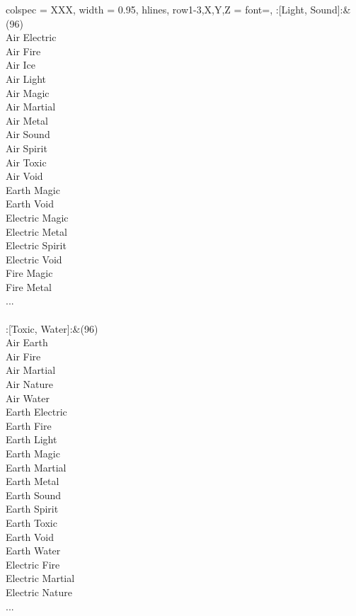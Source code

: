 \begin{longtblr}[
	caption = {2v2 Attacking Effective},
	label = {2v2-Attacking-Effective},
]{
	colspec = {XXX}, width = 0.95\linewidth,
	hlines,
	row{1-3,X,Y,Z} = {font=\bfseries},
}
	:[Light, Sound]:&{(96)\\
	Air Electric \\
	Air Fire \\
	Air Ice \\
	Air Light \\
	Air Magic \\
	Air Martial \\
	Air Metal \\
	Air Sound \\
	Air Spirit \\
	Air Toxic \\
	Air Void \\
	Earth Magic \\
	Earth Void \\
	Electric Magic \\
	Electric Metal \\
	Electric Spirit \\
	Electric Void \\
	Fire Magic \\
	Fire Metal \\
	...\\
	}\\

	:[Toxic, Water]:&{(96)\\
	Air Earth \\
	Air Fire \\
	Air Martial \\
	Air Nature \\
	Air Water \\
	Earth Electric \\
	Earth Fire \\
	Earth Light \\
	Earth Magic \\
	Earth Martial \\
	Earth Metal \\
	Earth Sound \\
	Earth Spirit \\
	Earth Toxic \\
	Earth Void \\
	Earth Water \\
	Electric Fire \\
	Electric Martial \\
	Electric Nature \\
	...\\
	}\\


\end{longtblr}
